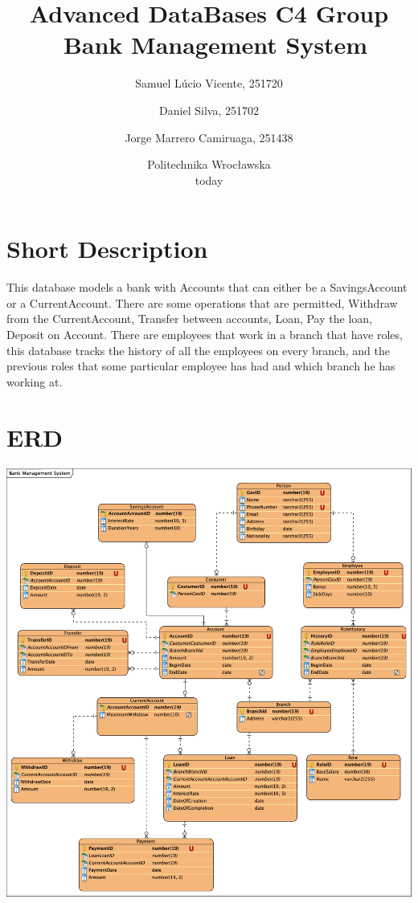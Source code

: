 \documentclass[a4paper, 10pt]{article}
\begin{document}
\title{Advanced DataBases C4 Group\\\
  \huge Bank Management System}
\author{
  Samuel Lúcio Vicente, 251720
  \and
  Daniel Silva, 251702
  \and
  Jorge Marrero Camiruaga, 251438
}

\date{Politechnika Wrocławska\\today}

\maketitle


\section{Short Description}
This database models a bank with Accounts that can either be a SavingsAccount or a CurrentAccount. There are some operations that are permitted, Withdraw from the CurrentAccount, Transfer between accounts, Loan, Pay the loan, Deposit on Account. There are employees that work in a branch that have roles, this database tracks the history of all the employees on every branch, and the previous roles that some particular employee has had and which branch he has working at.

\section{ERD}
\includegraphics[width=\textwidth,height=\textheight,keepaspectratio]{bms}
\end{document}
